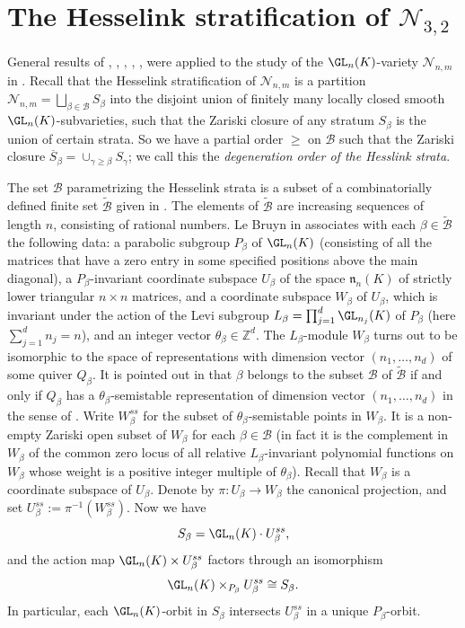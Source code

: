 \documentclass[12pt]{amsart}
\newcommand{\field}{K}
\begin{document}
\section{The Hesselink stratification of \texorpdfstring{$\mathcal{N}_{3,2}$}{N32}} \label{sec:hesselink}

General results of \cite{kempf}, \cite{ness}, \cite{Hesselink:1}, \cite{Hesselink:2}, 
\cite{kirwan}, \cite{kempf-ness} were applied to the study of the $\GL_n(\field)$-variety 
$\mathcal{N}_{n,m}$ in \cite{lebruyn}. 
Recall that the Hesselink stratification of $\mathcal{N}_{n,m}$ is a partition 
$\mathcal{N}_{n,m}=\bigsqcup_{\beta\in \mathcal{B}}S_\beta$ 
into the disjoint union of finitely many locally closed smooth $\GL_n(\field)$-subvarieties, such that the Zariski closure of any stratum $S_\beta$ is the union of  certain strata. So we have a partial order $\ge$ on $\mathcal{B}$ such that 
the Zariski closure $\overline{S}_\beta=\cup_{\gamma\ge \beta}S_\gamma$; we call this the \emph{degeneration order of the Hesslink strata}.  

The set $\mathcal{B}$ parametrizing the Hesselink strata is a subset of 
a combinatorially defined finite set $\widetilde{\mathcal{B}}$ given in \cite{Hesselink:2}. The elements of $\widetilde{\mathcal{B}}$ 
are increasing sequences of length $n$, consisting of rational numbers. 
Le Bruyn in \cite{lebruyn} associates with each $\beta\in \widetilde{\mathcal{B}}$ 
the following data: a parabolic subgroup $P_\beta$ of 
$\GL_n(\field)$ (consisting of all the matrices that have a zero entry 
in some specified positions above the main diagonal), 
a $P_\beta$-invariant coordinate subspace $U_\beta$ of the space 
$\mathfrak{n}_n(\field)$ of strictly lower triangular $n\times n$ matrices, 
and a coordinate subspace $W_\beta$ of $U_\beta$, which is invariant under 
the action of the Levi subgroup $L_\beta=\prod_{j=1}^d\GL_{n_j}(\field)$ 
of $P_\beta$ (here $\sum_{j=1}^d n_j=n$), and an integer vector 
$\theta_\beta\in\mathbb{Z}^d$. 
The $L_\beta$-module $W_\beta$ turns out to be isomorphic to the space of representations with dimension vector $(n_1,\dots,n_d)$ of some quiver $Q_\beta$.  
It is pointed out in \cite{lebruyn} that $\beta$ belongs to the subset $\mathcal{B}$ of 
$\widetilde{\mathcal{B}}$ if and only if $Q_\beta$ has a $\theta_\beta$-semistable representation of dimension vector $(n_1,\dots,n_d)$ in the sense of \cite{king}. 
Write $W_\beta^{ss}$ for the subset of $\theta_\beta$-semistable points in $W_\beta$. 
It is a non-empty Zariski open subset of $W_\beta$ for each $\beta\in\mathcal{B}$ 
(in fact it is the complement in $W_\beta$ of the common zero locus of all relative $L_\beta$-invariant polynomial functions on $W_\beta$ whose weight is a positive integer multiple of $\theta_\beta$). Recall that $W_\beta$ is a coordinate subspace 
of $U_\beta$. Denote by $\pi:U_\beta\to W_\beta$ the canonical projection, and 
set $U_\beta^{ss}:=\pi^{-1}(W_\beta^{ss})$. 
Now we have 
\[S_\beta=\GL_n(\field)\cdot U_\beta^{ss},\]
and the action map $\GL_n(\field)\times U_\beta^{ss}$ factors through an isomorphism 
\[\GL_n(\field)\times_{P_\beta} U_\beta^{ss}\cong S_\beta.\]
In particular, each $\GL_n(\field)$-orbit in $S_\beta$ intersects 
$U_\beta^{ss}$ in a unique $P_\beta$-orbit.  
\end{document}
